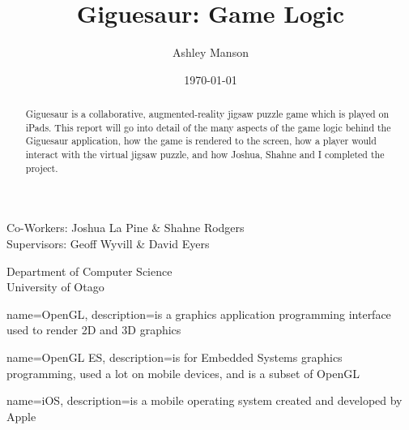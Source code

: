 \documentclass{article}
\begin{document}
\title{Giguesaur: Game Logic}
\author{Ashley Manson}
\date{\today}

\begin{titlepage}
\clearpage
\maketitle
\thispagestyle{empty} %

\begin{center}
\large 
Co-Workers: Joshua La Pine \& Shahne Rodgers\\
Supervisors: Geoff Wyvill \& David Eyers\\

\vspace*{1\baselineskip} %

Department of Computer Science\\
University of Otago

\end{center}

\end{titlepage}


\begin{abstract}
Giguesaur is a collaborative, augmented-reality jigsaw puzzle game which is
played on iPads. This report will go into detail of the many aspects of the game
logic behind the Giguesaur application, how the game is rendered to the screen,
how a player would interact with the virtual jigsaw puzzle, and how Joshua,
Shahne and I completed the project.
\end{abstract}

 { name={OpenGL}, description={is a graphics
    application programming interface used to render 2D and 3D graphics} }

 { name={OpenGL ES}, description={is for Embedded
    Systems graphics programming, used a lot on mobile devices, and is a subset
    of OpenGL} }

 { name={iOS}, description={is a mobile operating system
    created and developed by Apple} }
\end{document}
